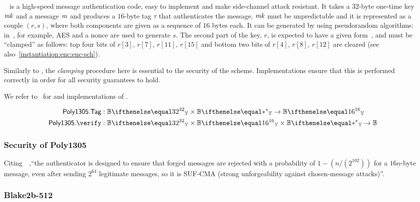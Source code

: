 ~\cite{bernstein2005state} is a high-speed message authentication code, easy to implement and make side-channel attack resistant. It takes a $32$-byte one-time key $\mathit{mk}$ and a message $\mathit{m}$ and produces a $16$-byte tag $\tau$ that authenticates the message. $\mathit{mk}$ must be unpredictable and it is represented as a couple $(r,s)$, where both components are given as a sequence of $16$ bytes each. It can be generated by using pseudorandom algorithms: in~\cite[Section 2]{bernstein2005state}, for example, AES and a nonce are used to generate $s$. The second part of the key, $r$, is expected to have a given form~\cite[Section 2]{bernstein2005state}, and must be ``clamped'' as follows: top four bits of $r[3]$, $r[7]$, $r[11]$, $r[15]$ and bottom two bits of $r[4]$, $r[8]$, $r[12]$ are cleared (see also~\cref{instantiation:enc:enc-sch}).
\begin{notebox}
    Similarly to , the \emph{clamping} procedure here is essential to the security of the  scheme. Implementations \MUST{} ensure that this is performed correctly in order for all security guarantees to hold.
\end{notebox}
We refer to~\cite[Section 2.5, Section 3]{langley2018chacha20} for \tagg{} and \verify{} implementations of .

\begin{align*}
    \polymac{1305}.\tagg &: \BBy{32} \times \BBy{*} \to \BBy{16}\\
    \polymac{1305}.\verify &: \BBy{32} \times \BBy{16} \times \BBy{*} \to \BB
\end{align*}

\subsubsection{Security of Poly1305}

Citing~~\cite[Section 4]{langley2018chacha20},``the  authenticator is designed to ensure that forged messages are rejected with a probability of $1-(n/(2^{102}))$ for a $16n$-byte message, even after sending $2^{64}$ legitimate messages, so it is SUF-CMA (strong unforgeability against chosen-message attacks)''.

\subsubsection{Blake2b-512}\label{instantiation:enc:algos:blake2b256512}

